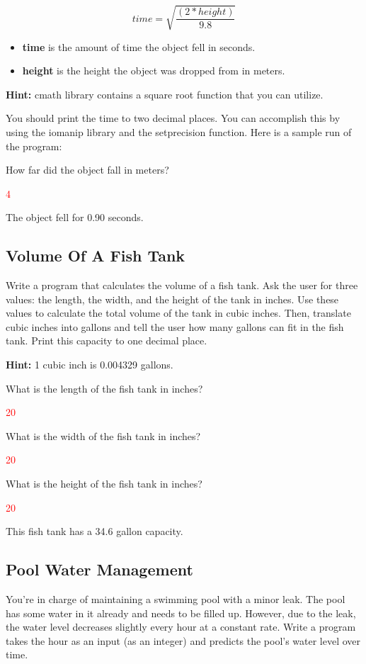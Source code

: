 $$time = \sqrt{\frac{(2*height)}{9.8}}$$

\begin{itemize}
    \item \textbf{time} is the amount of time the object fell in seconds.
    \item \textbf{height} is the height the object was dropped from in meters.
\end{itemize}

\textbf{Hint:} cmath library contains a square root function that you can utilize. 

You should print the time to two decimal places. You can accomplish this by using the iomanip library and the setprecision function. Here is a sample run of the program:

\begin{sample}
How far did the object fall in meters?

\textcolor{red}{4}

The object fell for 0.90 seconds.
\end{sample}

\subsection{Volume Of A Fish Tank}
Write a program that calculates the volume of a fish tank. Ask the user for three values: the length, the width, and the height of the tank in inches. Use these values to calculate the total volume of the tank in cubic inches. Then, translate cubic inches into gallons and tell the user how many gallons can fit in the fish tank. Print this capacity to one decimal place.

\textbf{Hint:} 1 cubic inch is 0.004329 gallons.


\begin{sample}
What is the length of the fish tank in inches?

\textcolor{red}{20}

What is the width of the fish tank in inches?

\textcolor{red}{20}

What is the height of the fish tank in inches?

\textcolor{red}{20}

This fish tank has a 34.6 gallon capacity.
\end{sample}

\subsection{Pool Water Management}
You're in charge of maintaining a swimming pool with a minor leak. The pool has some water in it already and needs to be filled up. However, due to the leak, the water level decreases slightly every hour at a constant rate. Write a program takes the hour as an input (as an integer) and predicts the pool's water level over time.

